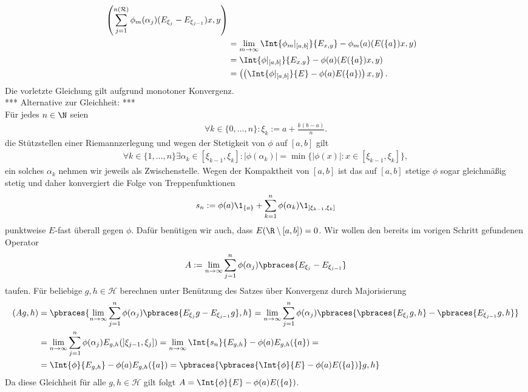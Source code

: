 \begin{solution}
\begin{align*}
  \left(\sum_{j=1}^{n(\mathcal{R})}
  \phi_m(\alpha_j)(E_{\xi_j} - E_{\xi_{j-1}})x,y\right) \\
  &= \lim_{m \to \infty} \Int{\phi_m|_{[a,b]}}{E_{x,y}} - \phi_m(a)(E(\{a\})x,y) \\
  &= \Int{\phi|_{[a,b]}}{E_{x,y}} - \phi(a)(E(\{a\})x,y) \\
  &= \left(\left(\Int{\phi|_{[a,b]}}{E} - \phi(a) E(\{a\})\right)x,y\right).
\end{align*}
Die vorletzte Gleichung gilt aufgrund monotoner Konvergenz. \\
*** Alternative zur Gleichheit: *** \\
Für jedes $n \in \N$ seien 
\begin{align*}
  \forall k \in \{0, \dots, n\}: \xi_k := a + \frac{k (b - a)}{n}.
\end{align*}
die Stützstellen einer Riemannzerlegung und wegen der Stetigkeit von $\phi$ auf $[a, b]$ gilt
\begin{align*}
  \forall k \in \{1, \dots, n\} \exists \alpha_k \in [\xi_{k-1}, \xi_k]: |\phi(\alpha_k)| = \min\{|\phi(x)| : x \in [\xi_{k - 1}, \xi_k]\},
\end{align*}
ein solches $\alpha_k$ nehmen wir jeweils als Zwischenstelle. Wegen der Kompaktheit von $[a, b]$ ist das auf $[a, b]$ stetige $\phi$ sogar gleichmäßig stetig und daher konvergiert die Folge von Treppenfunktionen 
\begin{align*}
  s_n := \phi(a) \1_{\{a\}} + \sum_{k = 1}^n \phi(\alpha_k) \1_{]\xi_{k-1}, \xi_k]}
\end{align*}
punktweise $E$-fast überall gegen $\phi$. Dafür benütigen wir auch, dass $E(\R \setminus [a, b]) = 0$. Wir wollen den bereits im vorigen Schritt gefundenen Operator
\begin{align*}
  A := \lim_{n \to \infty} \sum_{j = 1}^n \phi(\alpha_j) \pbraces{E_{\xi_j} - E_{\xi_{j - 1}}}
\end{align*} 
taufen. Für beliebige $g, h \in \mathcal{H}$ berechnen unter Benützung des Satzes über Konvergenz durch Majorisierung
\begin{align*}
  (Ag, h) &= \pbraces{\lim_{n \to \infty} \sum_{j = 1}^n \phi(\alpha_j) \pbraces{E_{\xi_j}g - E_{\xi_{j - 1}}g}, h} = \lim_{n \to \infty} \sum_{j = 1}^n \phi(\alpha_j) \pbraces{\pbraces{E_{\xi_j}g, h} - \pbraces{E_{\xi_{j - 1}}g, h}} \\
  & = \lim_{n \to \infty} \sum_{j = 1}^n \phi(\alpha_j) E_{g, h}(]\xi_{j - 1}, \xi_j]) = \lim_{n \to \infty} \Int{s_n}{E_{g,h}} - \phi(a) E_{g, h}(\{a\}) = \\
  &= \Int{\phi}{E_{g, h}} - \phi(a) E_{g, h}(\{a\}) = \pbraces{\pbraces{\Int{\phi}{E} - \phi(a)E(\{a\})}g, h}
\end{align*}
Da diese Gleichheit für alle $g, h \in \mathcal{H}$ gilt folgt $A = \Int{\phi}{E} - \phi(a)E(\{a\})$.
\end{solution}
